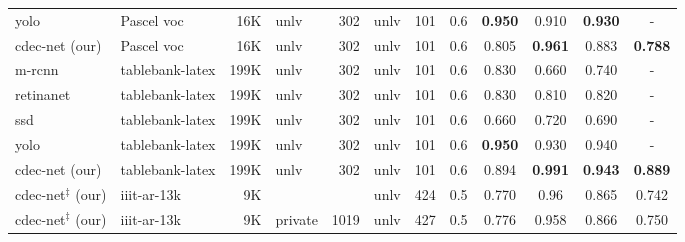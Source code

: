 \documentclass[a4paper,conference]{IEEEtran}
\begin{document}
\begin{table*}
\begin{center}
\begin{tabular}{|l| l | r|l |r|l|r| c| c c c c|}
{\sc yolo}~\cite{casado2019benefits} &Pascel {\sc voc} &16K &{\sc unlv} &302 &{\sc unlv} &101 &0.6 &\textbf{0.950} &0.910 &\textbf{0.930} &- \\
{\sc cd}e{\sc c-n}et (our) &Pascel {\sc voc} &16K &{\sc unlv} &302 &{\sc unlv} &101 &0.6 &0.805 &\textbf{0.961} &0.883 &\textbf{0.788} \\ 
\hhline{|=|=|=|=|=|=|=|=|====|}
{\sc m-rcnn}~\cite{casado2019benefits} &{\sc t}able{\sc b}ank-{\sc l}a{\sc t}e{\sc x} &199K &{\sc unlv} &302 &{\sc unlv} &101 &0.6 &0.830 &0.660 &0.740 &- \\
{\sc r}etina{\sc n}et~\cite{casado2019benefits} &{\sc t}able{\sc b}ank-{\sc l}a{\sc t}e{\sc x} &199K &{\sc unlv} &302 &{\sc unlv} &101 &0.6 &0.830 &0.810 &0.820 &- \\
{\sc ssd}~\cite{casado2019benefits} &{\sc t}able{\sc b}ank-{\sc l}a{\sc t}e{\sc x} &199K &{\sc unlv} &302 &{\sc unlv} &101 &0.6 &0.660 &0.720 &0.690 &- \\
{\sc yolo}~\cite{casado2019benefits} &{\sc t}able{\sc b}ank-{\sc l}a{\sc t}e{\sc x} &199K &{\sc unlv} &302 &{\sc unlv} &101 &0.6 &\textbf{0.950} &0.930 &0.940 &- \\
{\sc cd}e{\sc c-n}et (our) &{\sc t}able{\sc b}ank-{\sc l}a{\sc t}e{\sc x} &199K &{\sc unlv} &302 &{\sc unlv} &101 &0.6 &0.894 &\textbf{0.991} &\textbf{0.943} &\textbf{0.889} \\
\hhline{|=|=|=|=|=|=|=|=|====|}  
{\sc cd}e{\sc c-n}et$^{\ddagger}$ (our) &{\sc iiit-ar-13k} &9K & &  &{\sc unlv} &424 &0.5 &0.770 &0.96 &0.865 &0.742 \\ 
{\sc cd}e{\sc c-n}et$^{\ddagger}$ (our) &{\sc iiit-ar-13k} &9K &private &1019  &{\sc unlv} &427 &0.5 & 0.776 & 0.958 & 0.866 & 0.750 \\ \hline
\end{tabular}
\end{center}
\caption{Illustrates comparison between the proposed {\sc cd}e{\sc c-n}et and state-of-the-art techniques on {\sc unlv} dataset. {\sc \textbf{d4:}} indicates {\sc icdar-2013}+{\sc icdar-2017}+Marmot. {\sc cd}e{\sc c-n}et$^{\ddagger}$\textbf{:} indicates a single  model which is trained with {\sc iiit-ar-13k} dataset. \label{table_unlv}}
\end{table*}
\end{document}
